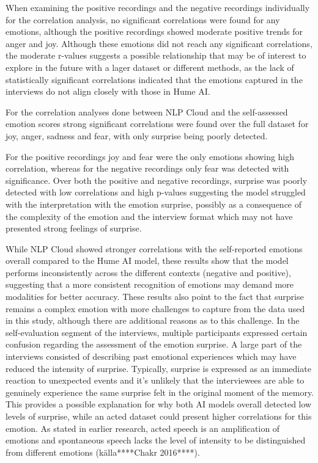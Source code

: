 When examining the positive recordings and the negative recordings individually for the correlation analysis, no significant correlations were found for any emotions, although the positive recordings showed moderate positive trends for anger and joy. Although these emotions did not reach any significant correlations, the moderate r-values suggests a possible relationship that may be of interest to explore in the future with a lager dataset or different methods, as the lack of statistically significant correlations indicated that the emotions captured in the interviews do not align closely with those in Hume AI. 

For the correlation analyses done between NLP Cloud and the self-assessed emotion scores strong significant correlations were found over the full dataset for joy, anger, sadness and fear, with only surprise being poorly detected.

For the positive recordings joy and fear were the only emotions showing high correlation, whereas for the negative recordings only fear was detected with significance. Over both the positive and negative recordings, surprise was poorly detected with low correlations and high p-values suggesting the model struggled with the interpretation with the emotion surprise, possibly as a consequence of the complexity of the emotion and the interview format which may not have presented strong feelings of surprise.

While NLP Cloud showed stronger correlations with the self-reported emotions overall compared to the Hume AI model, these results show that the model performs inconsistently across the different contexts (negative and positive), suggesting that a more consistent recognition of emotions may demand more modalities for better accuracy. These results also point to the fact that surprise remains a complex emotion with more challenges to capture from the data used in this study, although there are additional reasons as to this challenge. In the self-evaluation segment of the interviews, multiple participants expressed certain confusion regarding the assessment of the emotion surprise. A large part of the interviews consisted of describing past emotional experiences which may have reduced the intensity of surprise. Typically, surprise is expressed as an immediate reaction to unexpected events and it’s unlikely that the interviewees are able to genuinely experience the same surprise felt in the original moment of the memory. This provides a possible explanation for why both AI models overall detected low levels of surprise, while an acted dataset could present higher correlations for this emotion. As stated in earlier research, acted speech is an amplification of emotions and spontaneous speech lacks the level of intensity to be distinguished from different emotions (källa****Chakr 2016****).


